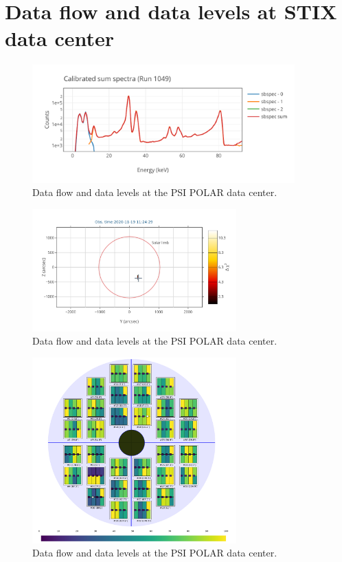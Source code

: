 \documentclass[preprint,11pt]{elsarticle}
\begin{document}
\section{Data flow and data levels at STIX data center}
\begin{figure}[!htb]
\begin{center}
\includegraphics[width=0.9\textwidth]{calibration-example.pdf}
\caption{Data flow and data levels at the PSI POLAR data center. }
\label{fig:ch1}
\end{center}
\end{figure}
\begin{figure}[!htb]
\begin{center}
\includegraphics[width=0.7\textwidth]{cfl.pdf}
\caption{Data flow and data levels at the PSI POLAR data center. }
\label{fig:cfl}
\end{center}
\end{figure}

\begin{figure}[!htb]
\begin{center}
\includegraphics[width=0.7\textwidth]{l1-det-view.pdf}
\caption{Data flow and data levels at the PSI POLAR data center. }
\label{fig:det-view}
\end{center}
\end{figure}
\end{document}
